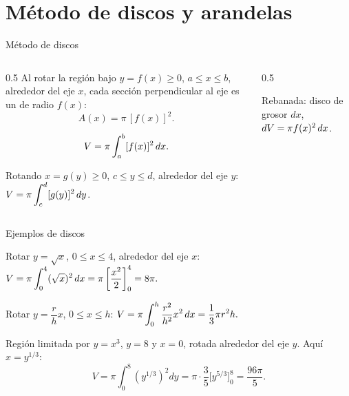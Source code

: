\documentclass[10pt,aspectratio=169]{beamer}
\begin{document}
\section{Método de discos y arandelas}

\begin{frame}{Método de discos}
  \begin{columns}
    \begin{column}{0.5\textwidth}
      Al rotar la región bajo $y=f(x)\ge0$, $a\le x\le b$, alrededor del eje $x$, cada sección perpendicular al eje es un
       de radio $f(x)$:
      \[ A(x)=\pi\,[f(x)]^2. \]
      \begin{teorema}[Discos]
        \[ V=\pi\int_a^b[f(x)]^2\,dx. \]
      \end{teorema}
      Rotando $x=g(y)\ge0$, $c\le y\le d$, alrededor del eje $y$: \ $V=\pi\displaystyle\int_c^d[g(y)]^2\,dy$.
    \end{column}
    \begin{column}{0.5\textwidth}
      \centering

      \small Rebanada: disco de grosor $dx$, \ $dV=\pi f(x)^2\,dx$.
    \end{column}
  \end{columns}
\end{frame}

\begin{frame}{Ejemplos de discos}
  \begin{ejemplo}[1: paraboloide]
    Rotar $y=\sqrt x$, $0\le x\le4$, alrededor del eje $x$:
    \quad $V=\pi\displaystyle\int_0^4(\sqrt x)^2\,dx=\pi\left[\frac{x^2}{2}\right]_0^4=8\pi.$
  \end{ejemplo}
  \begin{ejemplo}[2: cono]
    Rotar $y=\dfrac rhx$, $0\le x\le h$: \quad
    $V=\pi\displaystyle\int_0^h\frac{r^2}{h^2}x^2\,dx=\frac13\pi r^2h.$
  \end{ejemplo}
  \begin{ejemplo}
    Región limitada por $y=x^3$, $y=8$ y $x=0$, rotada alrededor del eje $y$. Aquí $x=y^{1/3}$:
    \[ V=\pi\int_0^8\left(y^{1/3}\right)^2dy=\pi\cdot\frac35\Big[y^{5/3}\Big]_0^8=\frac{96\pi}{5}. \]
  \end{ejemplo}
\end{frame}
\end{document}
